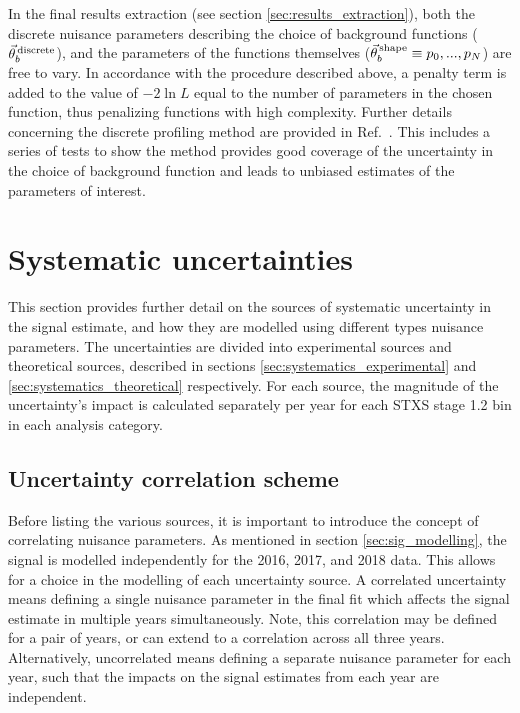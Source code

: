 In the final results extraction (see section \ref{sec:results_extraction}), both the discrete nuisance parameters describing the choice of background functions ($\vec{\theta}^{\,\rm{discrete}}_{b}$), and the parameters of the functions themselves ($\vec{\theta}^{\,\rm{shape}}_{b} \equiv p_0,...,p_N$) are free to vary. In accordance with the procedure described above, a penalty term is added to the value of $-2\ln{L}$ equal to the number of parameters in the chosen function, thus penalizing functions with high complexity. Further details concerning the discrete profiling method are provided in Ref.~\cite{Dauncey:2014xga}. This includes a series of tests to show the method provides good coverage of the uncertainty in the choice of background function and leads to unbiased estimates of the parameters of interest.

\section{Systematic uncertainties}\label{sec:systematics}
This section provides further detail on the sources of systematic uncertainty in the signal estimate, and how they are modelled using different types nuisance parameters. The uncertainties are divided into experimental sources and theoretical sources, described in sections \ref{sec:systematics_experimental} and \ref{sec:systematics_theoretical} respectively. For each source, the magnitude of the uncertainty's impact is calculated separately per year for each STXS stage 1.2 bin in each analysis category.

\subsection{Uncertainty correlation scheme}\label{sec:correlation_scheme}
Before listing the various sources, it is important to introduce the concept of correlating nuisance parameters. As mentioned in section \ref{sec:sig_modelling}, the signal is modelled independently for the 2016, 2017, and 2018 data. This allows for a choice in the modelling of each uncertainty source. A correlated uncertainty means defining a single nuisance parameter in the final fit which affects the signal estimate in multiple years simultaneously. Note, this correlation may be defined for a pair of years, or can extend to a correlation across all three years. Alternatively, uncorrelated means defining a separate nuisance parameter for each year, such that the impacts on the signal estimates from each year are independent. 


